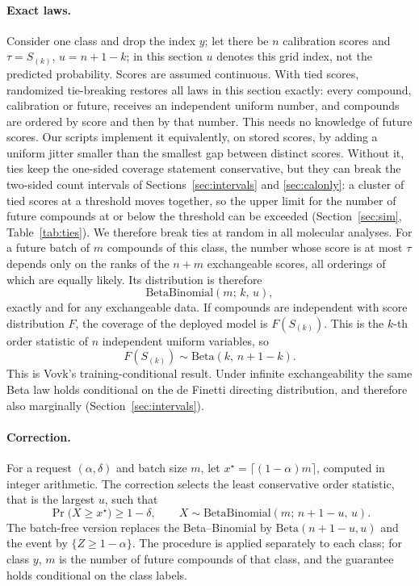 \documentclass[10pt]{article}
\begin{document}
\paragraph{Exact laws.} Consider one class and drop the index $y$; let there be $n$ calibration scores and $\tau=S_{(k)}$, $u=n+1-k$; in this section $u$ denotes this grid index, not the predicted probability. Scores are assumed continuous. With tied scores, randomized tie-breaking restores all laws in this section exactly: every compound, calibration or future, receives an independent uniform number, and compounds are ordered by score and then by that number. This needs no knowledge of future scores. Our scripts implement it equivalently, on stored scores, by adding a uniform jitter smaller than the smallest gap between distinct scores. Without it, ties keep the one-sided coverage statement conservative, but they can break the two-sided count intervals of Sections~\ref{sec:intervals} and \ref{sec:calonly}: a cluster of tied scores at a threshold moves together, so the upper limit for the number of future compounds at or below the threshold can be exceeded (Section~\ref{sec:sim}, Table~\ref{tab:ties}). We therefore break ties at random in all molecular analyses. For a future batch of $m$ compounds of this class, the number whose score is at most $\tau$ depends only on the ranks of the $n+m$ exchangeable scores, all orderings of which are equally likely. Its distribution is therefore
\begin{equation}
\mathrm{BetaBinomial}(m;\,k,\,u),
\end{equation}
exactly and for any exchangeable data.\citep{Marques2025Beta} If compounds are independent with score distribution $F$, the coverage of the deployed model is $F(S_{(k)})$. This is the $k$-th order statistic of $n$ independent uniform variables, so
\begin{equation}
F(S_{(k)})\sim\mathrm{Beta}(k,\,n+1-k).
\end{equation}
This is Vovk's training-conditional result.\citep{Vovk2012PAC,Bian2023TrainingConditional} Under infinite exchangeability the same Beta law holds conditional on the de Finetti directing distribution, and therefore also marginally (Section~\ref{sec:intervals}).

\paragraph{Correction.} For a request $(\alpha,\delta)$ and batch size $m$, let $x^\star=\lceil(1-\alpha)m\rceil$, computed in integer arithmetic. The correction selects the least conservative order statistic, that is the largest $u$, such that
\begin{equation}
\Pr\big(X\ge x^\star\big)\ge 1-\delta,\qquad X\sim\mathrm{BetaBinomial}(m;\,n+1-u,\,u).
\end{equation}
The batch-free version replaces the Beta--Binomial by $\mathrm{Beta}(n+1-u,u)$ and the event by $\{Z\ge1-\alpha\}$. The procedure is applied separately to each class; for class $y$, $m$ is the number of future compounds of that class, and the guarantee holds conditional on the class labels.
\end{document}
